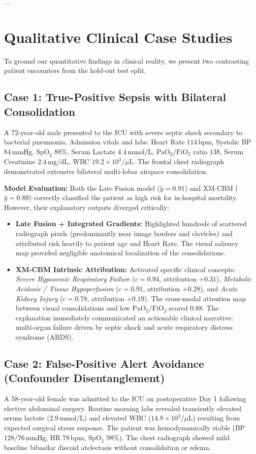 \documentclass[10pt,journal,compsoc,twocolumn]{IEEEtran}
\begin{document}
---

\section{Qualitative Clinical Case Studies}

To ground our quantitative findings in clinical reality, we present two contrasting patient encounters from the hold-out test split.

\subsection{Case 1: True-Positive Sepsis with Bilateral Consolidation}
A 72-year-old male presented to the ICU with severe septic shock secondary to bacterial pneumonia. Admission vitals and labs: Heart Rate $114\,\text{bpm}$, Systolic BP $84\,\text{mmHg}$, $\text{SpO}_2$ $88\%$, Serum Lactate $4.4\,\text{mmol/L}$, $\text{PaO}_2/\text{FiO}_2$ ratio $138$, Serum Creatinine $2.4\,\text{mg/dL}$, WBC $19.2 \times 10^3/\mu\text{L}$. The frontal chest radiograph demonstrated extensive bilateral multi-lobar airspace consolidation.

\textbf{Model Evaluation:} Both the Late Fusion model ($\hat{y} = 0.91$) and XM-CBM ($\hat{y} = 0.89$) correctly classified the patient as high risk for in-hospital mortality. However, their explanatory outputs diverged critically:
\begin{itemize}
    \item \textbf{Late Fusion + Integrated Gradients:} Highlighted hundreds of scattered radiograph pixels (predominantly near image borders and clavicles) and attributed risk heavily to patient age and Heart Rate. The visual saliency map provided negligible anatomical localization of the consolidations.
    \item \textbf{XM-CBM Intrinsic Attribution:} Activated specific clinical concepts: \textit{Severe Hypoxemic Respiratory Failure} ($c = 0.94$, attribution $+0.31$), \textit{Metabolic Acidosis / Tissue Hypoperfusion} ($c = 0.91$, attribution $+0.28$), and \textit{Acute Kidney Injury} ($c = 0.78$, attribution $+0.19$). The cross-modal attention map between visual consolidations and low $\text{PaO}_2/\text{FiO}_2$ scored $0.88$. The explanation immediately communicated an actionable clinical narrative: multi-organ failure driven by septic shock and acute respiratory distress syndrome (ARDS).
\end{itemize}

\subsection{Case 2: False-Positive Alert Avoidance (Confounder Disentanglement)}
A 58-year-old female was admitted to the ICU on postoperative Day 1 following elective abdominal surgery. Routine morning labs revealed transiently elevated serum lactate ($2.9\,\text{mmol/L}$) and elevated WBC ($14.8 \times 10^3/\mu\text{L}$) resulting from expected surgical stress response. The patient was hemodynamically stable (BP $128/76\,\text{mmHg}$, HR $78\,\text{bpm}$, $\text{SpO}_2$ $98\%$). The chest radiograph showed mild baseline bibasilar discoid atelectasis without consolidation or edema.
\end{document}
